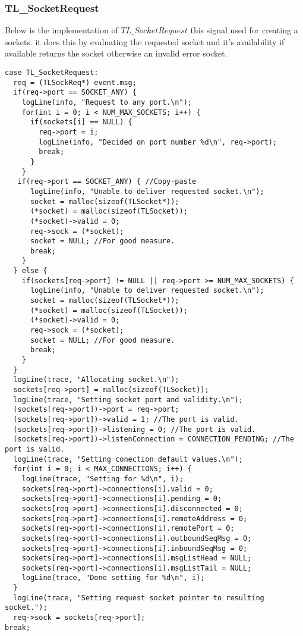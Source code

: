 \subsubsection{TL\_SocketRequest}
Below is the implementation of $TL\_SocketRequest$ this signal used for creating a sockets.
it does this by evaluating the requested socket and it's availability if available returns the socket otherwise an invalid error socket.
\begin{lstlisting}
case TL_SocketRequest:
  req = (TLSockReq*) event.msg;
  if(req->port == SOCKET_ANY) {
    logLine(info, "Request to any port.\n");
    for(int i = 0; i < NUM_MAX_SOCKETS; i++) {
      if(sockets[i] == NULL) {
        req->port = i;
        logLine(info, "Decided on port number %d\n", req->port);
        break;
      }
    }
   if(req->port == SOCKET_ANY) { //Copy-paste
      logLine(info, "Unable to deliver requested socket.\n");
      socket = malloc(sizeof(TLSocket*));
      (*socket) = malloc(sizeof(TLSocket));
      (*socket)->valid = 0;
      req->sock = (*socket);
      socket = NULL; //For good measure.
      break;
    }
  } else {
    if(sockets[req->port] != NULL || req->port >= NUM_MAX_SOCKETS) {
      logLine(info, "Unable to deliver requested socket.\n");
      socket = malloc(sizeof(TLSocket*));
      (*socket) = malloc(sizeof(TLSocket));
      (*socket)->valid = 0;
      req->sock = (*socket);
      socket = NULL; //For good measure.
      break;
    }
  }
  logLine(trace, "Allocating socket.\n");
  sockets[req->port] = malloc(sizeof(TLSocket));
  logLine(trace, "Setting socket port and validity.\n");
  (sockets[req->port])->port = req->port;
  (sockets[req->port])->valid = 1; //The port is valid.
  (sockets[req->port])->listening = 0; //The port is valid.
  (sockets[req->port])->listenConnection = CONNECTION_PENDING; //The port is valid.
  logLine(trace, "Setting conection default values.\n");
  for(int i = 0; i < MAX_CONNECTIONS; i++) {
    logLine(trace, "Setting for %d\n", i);
    sockets[req->port]->connections[i].valid = 0;
    sockets[req->port]->connections[i].pending = 0;
    sockets[req->port]->connections[i].disconnected = 0;
    sockets[req->port]->connections[i].remoteAddress = 0;
    sockets[req->port]->connections[i].remotePort = 0;
    sockets[req->port]->connections[i].outboundSeqMsg = 0;
    sockets[req->port]->connections[i].inboundSeqMsg = 0;
    sockets[req->port]->connections[i].msgListHead = NULL;
    sockets[req->port]->connections[i].msgListTail = NULL;
    logLine(trace, "Done setting for %d\n", i);
  }
  logLine(trace, "Setting request socket pointer to resulting socket.");
  req->sock = sockets[req->port];
break;
\end{lstlisting}

